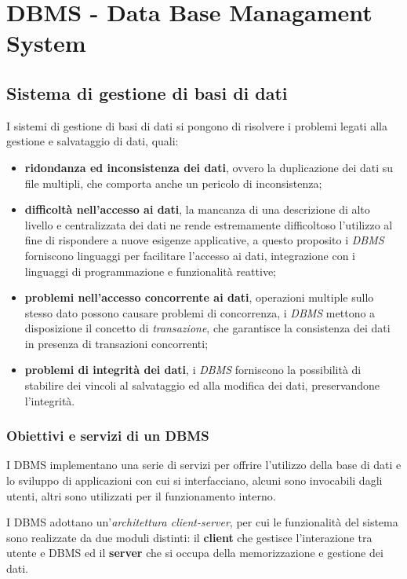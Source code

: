 \chapter{DBMS - Data Base Managament System}%
\label{cha:DBMS - Data Base Managament System}
\section{Sistema di gestione di basi di dati}%
\label{sec:Sistema di gestione di basi di dati}
I sistemi di gestione di basi di dati si pongono di risolvere i problemi legati
alla gestione e salvataggio di dati, quali:
\begin{itemize}
  \item \textbf{ridondanza ed inconsistenza dei dati}, ovvero la duplicazione
    dei dati su file multipli, che comporta anche un pericolo di inconsistenza;
  \item \textbf{difficoltà nell'accesso ai dati}, la mancanza di una descrizione
    di alto livello e centralizzata dei dati ne rende estremamente difficoltoso
    l'utilizzo al fine di rispondere a nuove esigenze applicative, a questo
    proposito i \emph{DBMS} forniscono linguaggi per facilitare l'accesso ai
    dati, integrazione con i linguaggi di programmazione e funzionalità
    reattive;
  \item \textbf{problemi nell'accesso concorrente ai dati}, operazioni multiple
    sullo stesso dato possono causare problemi di concorrenza, i \emph{DBMS}
    mettono a disposizione il concetto di \textit{transazione}, che garantisce
    la consistenza dei dati in presenza di transazioni concorrenti;
  \item \textbf{problemi di integrità dei dati}, i \emph{DBMS} forniscono la
    possibilità di stabilire dei vincoli al salvataggio ed alla modifica dei
    dati, preservandone l'integrità.
\end{itemize}

\subsection{Obiettivi e servizi di un DBMS}%
\label{sub:Obiettivi e servizi di un DBMS}
I DBMS implementano una serie di servizi per offrire l'utilizzo della base di
dati e lo sviluppo di applicazioni con cui si interfacciano, alcuni sono
invocabili dagli utenti, altri sono utilizzati per il funzionamento interno.

I DBMS adottano un'\textit{architettura client-server}, per cui le funzionalità
del sistema sono realizzate da due moduli distinti: il \textbf{client} che
gestisce l'interazione tra utente e DBMS ed il \textbf{server} che si occupa
della memorizzazione e gestione dei dati.

